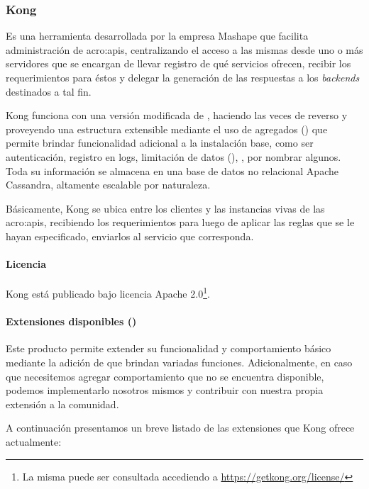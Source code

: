 \subsubsection{Kong}
\label{soa:tecnologias:kong}

Es una herramienta desarrollada por la empresa Mashape que facilita administración de \glspl{acro:api}, centralizando el acceso a las mismas desde uno o más servidores que se encargan de llevar registro de qué servicios ofrecen, recibir los requerimientos para éstos y delegar la generación de las respuestas a los \textit{backends} destinados a tal fin.

Kong funciona con una versión modificada de , haciendo las veces de  reverso y proveyendo una estructura extensible mediante el uso de agregados () que permite brindar funcionalidad adicional a la instalación base, como ser autenticación, registro en logs, limitación de datos (), , por nombrar algunos. Toda su información se almacena en una base de datos no relacional Apache Cassandra, altamente escalable por naturaleza.

Básicamente, Kong se ubica entre los clientes y las instancias vivas de las \glspl{acro:api}, recibiendo los requerimientos para luego de aplicar las reglas que se le hayan especificado, enviarlos al servicio que corresponda.

\paragraph{Licencia}

Kong está publicado bajo licencia Apache 2.0\footnote{La misma puede ser consultada accediendo a \url{https://getkong.org/license/}}.

\paragraph{Extensiones disponibles ()}

Este producto permite extender su funcionalidad y comportamiento básico mediante la adición de  que brindan variadas funciones. Adicionalmente, en caso que necesitemos agregar comportamiento que no se encuentra disponible, podemos implementarlo nosotros mismos y contribuir con nuestra propia extensión a la comunidad.

A continuación presentamos un breve listado de las extensiones que Kong ofrece actualmente:

